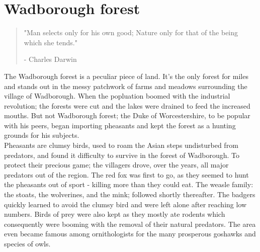 \documentclass[smalldemyvopaper,11pt,twoside,onecolumn,openright,extrafontsizes]{memoir}
\begin{document}






\mainmatter
\chapter{Wadborough forest}
\vspace{-1.3cm}
\begin{localsize}{10}
	\begin{quote}
		"Man selects only for his own good; Nature only for that of the being which she tends."
		\begin{flushright}- Charles Darwin\end{flushright}
	\end{quote} 
\end{localsize}
\vspace{1cm}

The Wadborough forest is a peculiar piece of land. It's the only forest for miles and stands out in the messy patchwork of farms and meadows surrounding the village of Wadborough. When the popluation boomed with the industrial revolution; the forests were cut and the lakes were drained to feed the increased mouths. But not Wadborough forest; the Duke of Worcestershire, to be popular with his peers, began importing pheasants and kept the forest as a hunting grounds for his subjects.\\
 
Pheasants are clumsy birds, used to roam the Asian steps undisturbed from predators, and found it difficulty to survive in the forest of Wadborough. To protect their precious game; the villagers drove, over the years, all major predators out of the region. The red fox was first to go, as they seemed to hunt the pheasants out of sport - killing more than they could eat. The weasle family: the stoats, the wolverines, and the mink; followed shortly thereafter. The badgers quickly learned to avoid the clumsy bird and were left alone after reaching low numbers. Birds of prey were also kept as they mostly ate rodents which consequently were booming with the removal of their natural predators. The area even became famous among ornithologists for the many prosperous goshawks and species of owls.\\
\end{document}
